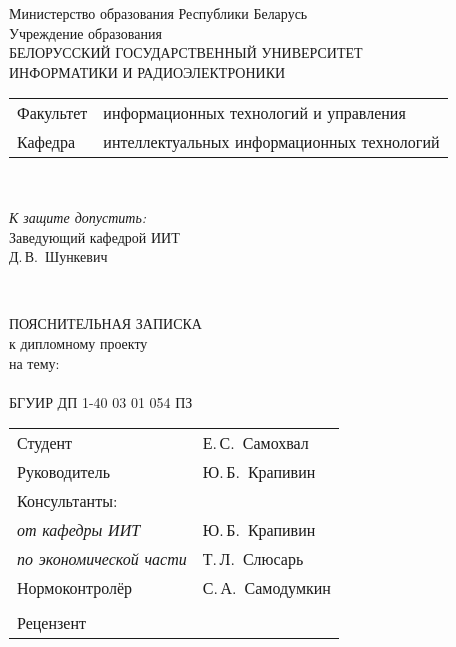 \begin{titlepage}
  \begin{center}
    Министерство образования Республики Беларусь\\[1em]
    Учреждение образования\\
    БЕЛОРУССКИЙ ГОСУДАРСТВЕННЫЙ УНИВЕРСИТЕТ \\
    ИНФОРМАТИКИ И РАДИОЭЛЕКТРОНИКИ\\[1em]

    \begin{minipage}{\textwidth}
      \begin{flushleft}
        \begin{tabular}{ l l }
          Факультет & информационных технологий и управления\\
          Кафедра   & интеллектуальных информационных технологий
        \end{tabular}
      \end{flushleft}
    \end{minipage}\\[1em]

    \begin{flushright}
      \begin{minipage}{0.4\textwidth}
        \textit{К защите допустить:}\\[0.8em]
        Заведующий кафедрой ИИТ\\[0.45em]
        \underline{\hspace*{2.8cm}} Д.\,В.~Шункевич
      \end{minipage}\\[2.2em]
    \end{flushright}

    {ПОЯСНИТЕЛЬНАЯ ЗАПИСКА}\\
    {к дипломному проекту}\\

    {на тему:}\\[1em]
    \textbf{\large \MakeUppercase{\topicName}}\\[1em]


    {БГУИР ДП 1-40 03 01 054 ПЗ}\\[2em]
    
    \begin{tabular}{ p{}p{} }
      Студент & Е.\,С.~Самохвал \\
      Руководитель & Ю.\,Б.~Крапивин \\
      Консультанты: &\\
      \hspace*{3ex}\emph{от кафедры ИИТ} & Ю.\,Б.~Крапивин \\
      \hspace*{3ex}\emph{по экономической части} & Т.\,Л.~Слюсарь \\
      Нормоконтролёр & С.\,А.~Самодумкин\\
      & \\
      Рецензент &
    \end{tabular}
    

\end{center}
\end{titlepage}
